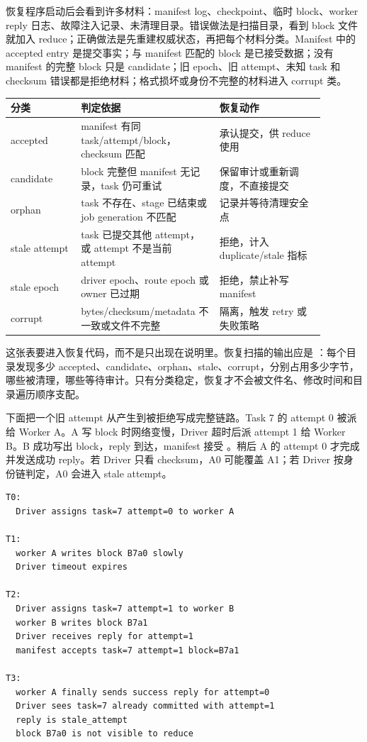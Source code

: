 恢复程序启动后会看到许多材料：manifest log、checkpoint、临时 block、worker reply 日志、故障注入记录、未清理目录。错误做法是扫描目录，看到 block 文件就加入 reduce；正确做法是先重建权威状态，再把每个材料分类。Manifest 中的 accepted entry 是提交事实；与 manifest 匹配的 block 是已接受数据；没有 manifest 的完整 block 只是 candidate；旧 epoch、旧 attempt、未知 task 和 checksum 错误都是拒绝材料；格式损坏或身份不完整的材料进入 corrupt 类。

\begin{center}
\small
\begin{tabular}{@{}p{0.20\linewidth}p{0.38\linewidth}p{0.30\linewidth}@{}}
\toprule
分类 & 判定依据 & 恢复动作 \\
\midrule
accepted & manifest 有同 task/attempt/block，checksum 匹配 & 承认提交，供 reduce 使用 \\
candidate & block 完整但 manifest 无记录，task 仍可重试 & 保留审计或重新调度，不直接提交 \\
orphan & task 不存在、stage 已结束或 job generation 不匹配 & 记录并等待清理安全点 \\
stale attempt & task 已提交其他 attempt，或 attempt 不是当前 attempt & 拒绝，计入 duplicate/stale 指标 \\
stale epoch & driver epoch、route epoch 或 owner 已过期 & 拒绝，禁止补写 manifest \\
corrupt & bytes/checksum/metadata 不一致或文件不完整 & 隔离，触发 retry 或失败策略 \\
\bottomrule
\end{tabular}
\end{center}

这张表要进入恢复代码，而不是只出现在说明里。恢复扫描的输出应是 ：每个目录发现多少 accepted、candidate、orphan、stale、corrupt，分别占用多少字节，哪些被清理，哪些等待审计。只有分类稳定，恢复才不会被文件名、修改时间和目录遍历顺序支配。

下面把一个旧 attempt 从产生到被拒绝写成完整链路。Task 7 的 attempt 0 被派给 Worker A。A 写 block 时网络变慢，Driver 超时后派 attempt 1 给 Worker B。B 成功写出 block，reply 到达，manifest 接受 。稍后 A 的 attempt 0 才完成并发送成功 reply。若 Driver 只看 checksum，A0 可能覆盖 A1；若 Driver 按身份链判定，A0 会进入 stale attempt。

\begin{lstlisting}[numbers=none,caption={迟到 attempt 的端到端事件链}]
T0:
  Driver assigns task=7 attempt=0 to worker A

T1:
  worker A writes block B7a0 slowly
  Driver timeout expires

T2:
  Driver assigns task=7 attempt=1 to worker B
  worker B writes block B7a1
  Driver receives reply for attempt=1
  manifest accepts task=7 attempt=1 block=B7a1

T3:
  worker A finally sends success reply for attempt=0
  Driver sees task=7 already committed with attempt=1
  reply is stale_attempt
  block B7a0 is not visible to reduce
\end{lstlisting}


